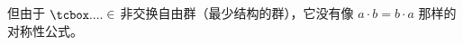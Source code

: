 \begin{preview}
\begin{minipage}{\textwidth}
但由于 $\atom \in$ 非交换自由群（最少结构的群），它没有像 $a \cdot b = b \cdot a$ 那样的对称性公式。












\end{minipage}
\end{preview}
